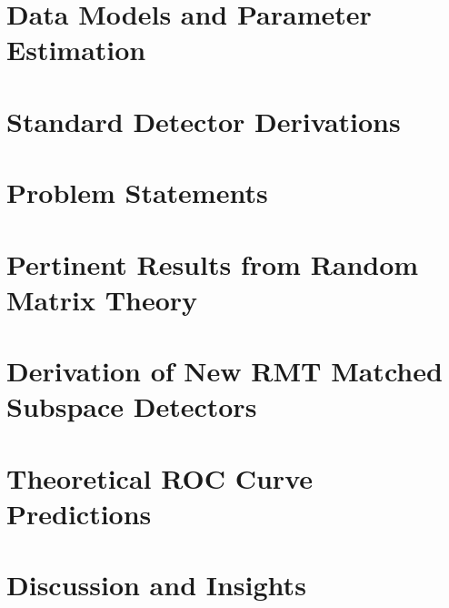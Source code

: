 \documentclass[10pt,twocolumn,twoside]{IEEEtran}
\begin{document}
\section{Data Models and Parameter Estimation}\label{sec:data_models}


\section{Standard Detector Derivations}\label{sec:std_detecs}


\section{Problem Statements}\label{sec:prob_state}


\section{Pertinent Results from Random Matrix Theory}\label{sec:rmt}


\section{Derivation of New RMT Matched Subspace Detectors}\label{sec:rmt_detecs}



%

\section{Theoretical ROC Curve Predictions}\label{sec:roc_theory}


\section{Discussion and Insights}\label{sec:results}

\end{document}

